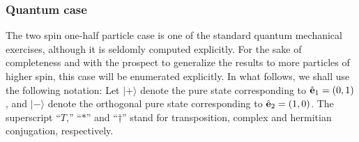\documentclass[pra,amsfonts,showpacs,showkeys,preprint]{revtex4}
\begin{document}


\subsubsection{Quantum case}

The two spin one-half particle case is one of the standard quantum mechanical exercises, although
it is seldomly computed explicitly.
For the sake of completeness and with the prospect to generalize the results to more particles of higher spin,
this case will be enumerated explicitly.
In what follows, we shall use the following notation:
Let
$
\vert +\rangle
$
denote the pure state corresponding to
$ {\hat {\bf e}}_1 =(0,1)
$,
and
$
\vert -\rangle $ denote the orthogonal pure state
corresponding to
${\hat {\bf e}}_2 =(1,0)
$.
The superscript
``$T$,''
``$\ast$'' and
``$\dagger$'' stand for transposition, complex and hermitian conjugation, respectively.
\end{document}
